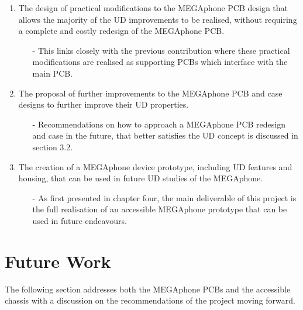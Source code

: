 \begin{enumerate}
\begin{enumerate}
        \end{enumerate} 
    \item The design of practical modifications to the MEGAphone PCB design that allows the majority of the UD improvements to be realised, without requiring a complete and costly redesign of the MEGAphone PCB.
        \begin{enumerate}
        \item[-] This links closely with the previous contribution where these practical modifications are realised as supporting PCBs which interface with the main PCB.
        \end{enumerate} 
    \item The proposal of further improvements to the MEGAphone PCB and case designs to further improve their UD properties.
        \begin{enumerate}
        \item[-] Recommendations on how to approach a MEGAphone PCB redesign and case in the future, that better satisfies the UD concept is discussed in section 3.2.
        \end{enumerate} 
    \item The creation of a MEGAphone device prototype, including UD features and housing, that can be used in future UD studies of the MEGAphone.
        \begin{enumerate}
        \item[-] As first presented in chapter four, the main deliverable of this project is the full realisation of an accessible MEGAphone prototype that can be used in future endeavours.
        \end{enumerate} 
\end{enumerate}

\section{Future Work}
The following section addresses both the MEGAphone PCBs and the accessible chassis with a discussion on the recommendations of the project moving forward.

